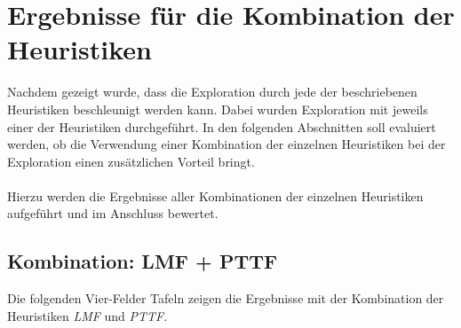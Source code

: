 \section{Ergebnisse für die Kombination der Heuristiken}\label{sec_evalKombis}
Nachdem gezeigt wurde, dass die Exploration durch jede der beschriebenen Heuristiken beschleunigt werden kann. Dabei wurden Exploration mit jeweils einer der Heuristiken durchgeführt. In den folgenden Abschnitten soll evaluiert werden, ob die Verwendung einer Kombination der einzelnen Heuristiken bei der Exploration einen zusätzlichen Vorteil bringt.
\\\\
Hierzu werden die Ergebnisse aller Kombinationen der einzelnen Heuristiken aufgeführt und im Anschluss bewertet.
\subsection{Kombination: LMF + PTTF}\label{sec_evalLMFPTTF}
Die folgenden Vier-Felder Tafeln zeigen die Ergebnisse mit der Kombination der Heuristiken \emph{LMF} und \emph{PTTF}.
\begin{multicols}{3}
\columnbreak
{}\columnbreak
{}
\end{multicols}

\begin{multicols}{2}
\columnbreak
{}
\end{multicols}

\begin{multicols}{2}
\columnbreak
{}
\end{multicols}

\begin{multicols}{2}
\columnbreak
{}
\end{multicols}

